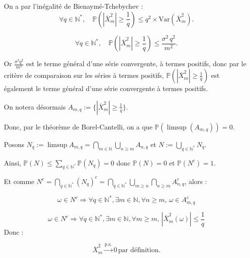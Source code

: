 \documentclass{article}
\begin{document}
\vspace{0.5cm}
\noindent
On a par l'inégalité de Bienaymé-Tchebychev :  
\[
\forall q \in \mathbb{N}^*, \quad \mathbb{P}\left(|\overline{X}_m^2| \geq \frac{1}{q}\right) \leq q^2 \times \text{Var}(\overline{X}_m^2).
\]

\[
\forall q \in \mathbb{N}^*, \quad \mathbb{P}\left(|\overline{X}_m^2| \geq \frac{1}{q}\right) \leq \frac{\sigma^2 \, q^2}{m^2}.
\]

\begin{justify}
\noindent
Or $\frac{\sigma^2 q^2}{m^2}$ est le terme général d'une série convergente, à termes positifs, donc par le critère de comparaison sur les séries à termes positifs, $\mathbb{P}(|\overline{X}_m^2| \geq \frac{1}{q})$ est également le terme général d'une série convergente à termes positifs.

\end{justify}

\noindent
On notera désormais $A_{m,q} := \{ |\overline{X}_m^2| \geq \frac{1}{q} \}$.  

\vspace{0.5cm}
\noindent
Donc, par le théorème de Borel-Cantelli, on a que $\mathbb{P}(\limsup (A_{m,q})) = 0$.

\vspace{0.5cm}
\noindent
Posons $N_q := \limsup A_{m,q} = \bigcap_{m \in \mathbb{N}} \bigcup_{n \geq m} A_{n,q}$ et $N := \bigcup_{q \in \mathbb{N}^*} N_q$. 

\vspace{0.5cm}
\noindent
Ainsi, $\mathbb{P}(N) \leq \sum_{q \in \mathbb{N}^*} \mathbb{P}(N_q) = 0$ donc $\mathbb{P}(N) = 0$ et $\mathbb{P}(N^c) = 1$.

\vspace{0.5cm}
\noindent
Et comme $N^c = \bigcap_{q \in \mathbb{N}^*} (N_q)^c = \bigcap_{q \in \mathbb{N}^*} \bigcup_{m \geq n} \bigcap_{n \geq m} A_{n,q}^c$, alors :

\vspace{0.5cm}

\[
\omega \in N^c \Rightarrow \forall q \in \mathbb{N}^*, \exists m \in \mathbb{N}, \forall n \geq m, \, \omega \in A_{m,q}^c
\]

\[
\omega \in N^c \Rightarrow \forall q \in \mathbb{N}^*, \exists m \in \mathbb{N}, \forall m \geq m, \, |\overline{X}_m^2(\omega)| \leq \frac{1}{q} 
\] Donc : 

\[
\overline{X}_m^2 \xrightarrow{\text{p.s.}} 0 \, \text{par définition.}
\]
\vspace{5cm}
\end{document}
